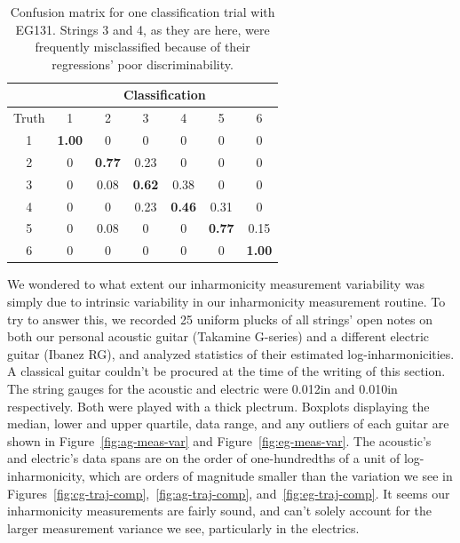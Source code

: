 \documentclass[12pt]{cmuthesis}
\begin{document}
\begin{table}
\begin{center}
\begin{tabular}{|c||c|c|c|c|c|c|}
\hline
& \multicolumn{6}{|c|}{Classification} \\
\hline
Truth &1	&2	&3	&4	&5	&6\\
\hline
\hline
1	&\bf{1.00}	& 0	& 0	& 0	&0	& 0 \\ 
\hline
2	&0	& \bf{0.77}	& 0.23	& 0	&0	& 0 \\
\hline
3	&0	& 0.08	& \bf{0.62}	&0.38	& 0	& 0 \\ 
\hline
4	&0	& 0	& 0.23	&\bf{0.46}	& 0.31	& 0 \\
\hline
5	&0	& 0.08	& 0	&0	& \bf{0.77}	& 0.15\\ 
\hline
6	&0	& 0	& 0	&0	&0	& \bf{1.00} \\
\hline
\end{tabular}
\caption{Confusion matrix for one classification trial with EG131. Strings 3 and 4, as they are here, were frequently misclassified because of their regressions' poor discriminability.} 
\label{tab:cf-eg}
\end{center}
\end{table}

We wondered to what extent our inharmonicity measurement variability was simply due to intrinsic variability in our inharmonicity measurement routine. To try to answer this, we recorded 25 uniform plucks of all strings' open notes on both our personal acoustic guitar (Takamine G-series) and a different electric guitar (Ibanez RG), and analyzed statistics of their estimated log-inharmonicities. A classical guitar couldn't be procured at the time of the writing of this section. The string gauges for the acoustic and electric were 0.012in and 0.010in respectively. Both were played with a thick plectrum. Boxplots displaying the median, lower and upper quartile, data range, and any outliers of each guitar are shown in Figure~\ref{fig:ag-meas-var} and Figure~\ref{fig:eg-meas-var}. The acoustic's and electric's data spans are on the order of one-hundredths of a unit of log-inharmonicity, which are orders of magnitude smaller than the variation we see in Figures~\ref{fig:cg-traj-comp},~\ref{fig:ag-traj-comp}, and~\ref{fig:eg-traj-comp}. It seems our inharmonicity measurements are fairly sound, and can't solely account for the larger measurement variance we see, particularly in the electrics. 
\end{document}
